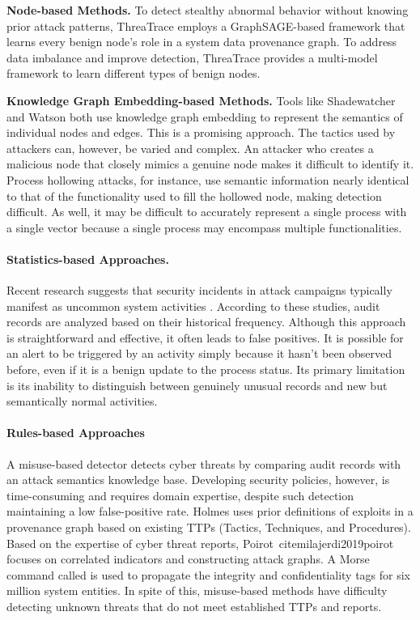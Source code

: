 \noindent
{\bf Node-based Methods.} To detect stealthy abnormal behavior without knowing prior attack patterns, ThreaTrace\cite{wang2022threatrace} employs a GraphSAGE-based framework that learns every benign node's role in a system data provenance graph. To address data imbalance and improve detection, ThreaTrace provides a multi-model framework to learn different types of benign nodes.

\noindent
{\bf Knowledge Graph Embedding-based Methods.} Tools like Shadewatcher\cite{zengy2022shadewatcher} and Watson\cite{zeng2021watson} both use knowledge graph embedding to represent the semantics of individual nodes and edges. This is a promising approach. The tactics used by attackers can, however, be varied and complex. An attacker who creates a malicious node that closely mimics a genuine node makes it difficult to identify it. Process hollowing attacks, for instance, use semantic information nearly identical to that of the functionality used to fill the hollowed node, making detection difficult. As well, it may be difficult to accurately represent a single process with a single vector because a single process may encompass multiple functionalities.


\paragraph{Statistics-based Approaches.} Recent research suggests that security incidents in attack campaigns typically manifest as uncommon system activities \cite{liu2018towards,hassan2019nodoze,hassan2020we}. According to these studies, audit records are analyzed based on their historical frequency. Although this approach is straightforward and effective, it often leads to false positives. It is possible for an alert to be triggered by an activity simply because it hasn't been observed before,  even if it is a benign update to the process status. Its primary limitation is its inability to distinguish between genuinely unusual records and new but semantically normal activities.

\paragraph{Rules-based Approaches}
A misuse-based detector detects cyber threats by comparing audit records with an attack semantics knowledge base.
Developing security policies, however, is time-consuming and requires domain expertise, despite such detection maintaining a low false-positive rate.
Holmes \cite{milajerdi2019holmes} uses prior definitions of exploits in a provenance graph based on existing TTPs (Tactics, Techniques, and Procedures).
Based on the expertise of cyber threat reports, Poirot\
cite{milajerdi2019poirot} focuses on correlated indicators and constructing attack graphs.
A Morse command called \cite{hossain2020combating} is used to propagate the integrity and confidentiality tags for six million system entities.
In spite of this, misuse-based methods have difficulty detecting unknown threats that do not meet established TTPs and reports.


